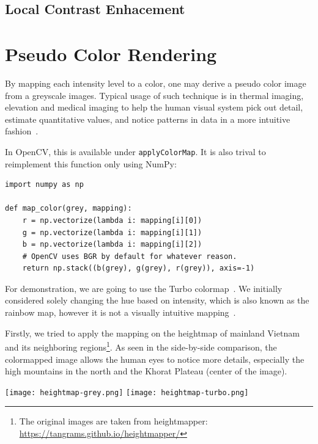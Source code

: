 \documentclass[a4paper,12pt]{article}
\begin{document}
\subsection{Local Contrast Enhacement}

\section{Pseudo Color Rendering}
By mapping each intensity level to a color, one may derive a pseudo color image
from a greyscale images.  Typical usage of such technique is in thermal imaging,
elevation and medical imaging to help the human visual system pick out detail,
estimate quantitative values, and notice patterns in data in a more intuitive
fashion~\cite{turbo}.

In OpenCV, this is available under \verb|applyColorMap|.  It is also trival
to reimplement this function only using NumPy:
\begin{verbatim}
import numpy as np

def map_color(grey, mapping):
    r = np.vectorize(lambda i: mapping[i][0])
    g = np.vectorize(lambda i: mapping[i][1])
    b = np.vectorize(lambda i: mapping[i][2])
    # OpenCV uses BGR by default for whatever reason.
    return np.stack((b(grey), g(grey), r(grey)), axis=-1)
\end{verbatim}

For demonstration, we are going to use the Turbo colormap~\cite{turbo}.
We initially considered solely changing the hue based on intensity,
which is also known as the rainbow map, however it is not a visually
intuitive mapping~\cite{rainbowbad}.

Firstly, we tried to apply the mapping on the heightmap of mainland Vietnam and
its neighboring regions\footnote{The original images are taken from
heightmapper: \url{https://tangrams.github.io/heightmapper/}}.  As seen in
the side-by-side comparison, the colormapped image allows the human eyes
to notice more details, especially the high mountains in the north and
the Khorat Plateau (center of the image).
\begin{center}
  \texttt{[image: heightmap-grey.png]}
  \texttt{[image: heightmap-turbo.png]}
\end{center}
\end{document}
